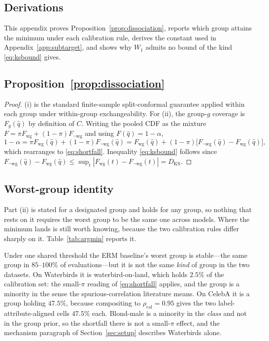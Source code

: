\documentclass[pdflatex,sn-basic]{sn-jnl}%
\theoremstyle{thmstyleone}%
\newcommand{\wg}{\mathrm{wg}}
\newcommand{\Wone}{W_1}
\newcommand{\rhocal}{\rho_{\mathrm{cal}}}
\begin{document}
\begin{appendices}
\section{Derivations}
\label{app:proofs}

This appendix proves Proposition~\ref{prop:dissociation}, reports which group attains the minimum
under each calibration rule, derives the constant used in Appendix~\ref{app:subtarget}, and shows
why $\Wone$ admits no bound of the kind \eqref{eq:ksbound} gives.

\subsection*{Proposition~\ref{prop:dissociation}}

\begin{proof}
(i) is the standard finite-sample split-conformal guarantee applied within each
group under within-group exchangeability. For (ii), the group-$g$ coverage is
$F_g(\hat q)$ by definition of $C$. Writing the pooled CDF as the mixture
$F=\pi F_{\wg}+(1-\pi)F_{\neg\wg}$ and using $F(\hat q)=1-\alpha$,
\[
1-\alpha=\pi F_{\wg}(\hat q)+(1-\pi)F_{\neg\wg}(\hat q)
        =F_{\wg}(\hat q)+(1-\pi)\big[F_{\neg\wg}(\hat q)-F_{\wg}(\hat q)\big],
\]
which rearranges to \eqref{eq:shortfall}. Inequality \eqref{eq:ksbound} follows since
$F_{\neg\wg}(\hat q)-F_{\wg}(\hat q)\le\sup_t|F_{\wg}(t)-F_{\neg\wg}(t)|=D_{\mathrm{KS}}$.
\end{proof}

\subsection*{Worst-group identity}

Part (ii) is stated for a designated group and holds for any group, so nothing that rests on it
requires the worst group to be the same one across models. Where the minimum lands is still worth
knowing, because the two calibration rules differ sharply on it. Table~\ref{tab:argmin} reports
it.

Under one shared threshold the ERM baseline's worst group is stable---the same group in
$85$--$100\%$ of evaluations---but it is not the same \emph{kind} of group in the two datasets. On
Waterbirds it is waterbird-on-land, which holds $2.5\%$ of the calibration set: the small-$\pi$
reading of \eqref{eq:shortfall} applies, and the group is a minority in the sense the
spurious-correlation literature means. On CelebA it is a group holding $47.5\%$, because
compositing to $\rhocal=0.95$ gives the two label-attribute-aligned cells $47.5\%$ each. Blond-male
is a minority in the \emph{class} and not in the group prior, so the shortfall there is not a
small-$\pi$ effect, and the mechanism paragraph of Section~\ref{sec:setup} describes Waterbirds
alone.


\end{appendices}
\end{document}

